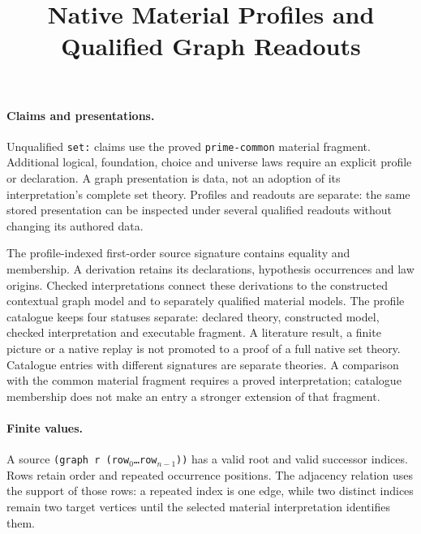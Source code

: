 \documentclass[11pt]{article}
\title{Native Material Profiles and Qualified Graph Readouts}
\author{}
\date{}
\begin{document}
\maketitle

\paragraph{Claims and presentations.}
Unqualified \texttt{set:} claims use the proved \texttt{prime-common}
material fragment. Additional logical, foundation, choice and universe laws
require an explicit profile or declaration. A graph presentation is data,
not an adoption of its interpretation's complete set theory. Profiles and
readouts are separate: the same stored presentation can be inspected under
several qualified readouts without changing its authored data.

The profile-indexed first-order source signature contains equality and
membership. A derivation retains its declarations, hypothesis occurrences
and law origins. Checked interpretations connect these derivations to the
constructed contextual graph model and to separately qualified material
models. The profile catalogue keeps four statuses separate: declared theory,
constructed model, checked interpretation and executable fragment. A
literature result, a finite picture or a native replay is not promoted to a
proof of a full native set theory.
Catalogue entries with different signatures are separate theories. A
comparison with the common material fragment requires a proved interpretation;
catalogue membership does not make an entry a stronger extension of that
fragment.

\paragraph{Finite values.}
A source \texttt{(graph r (row$_0$\ldots row$_{n-1}$))} has a valid root and
valid successor indices. Rows retain order and repeated occurrence positions.
The adjacency relation uses the support of those rows: a repeated index is
one edge, while two distinct indices remain two target vertices until the
selected material interpretation identifies them.
\end{document}
